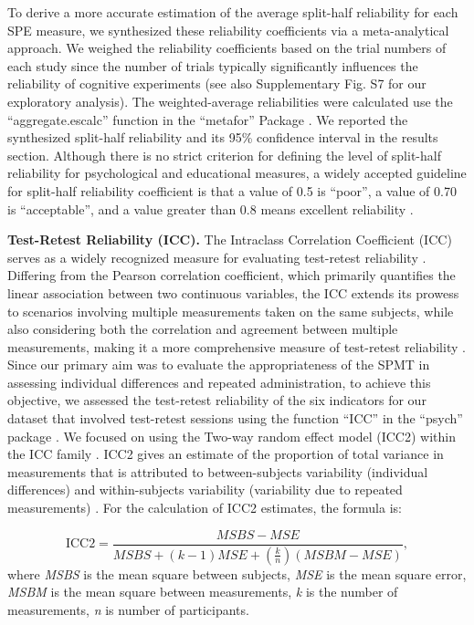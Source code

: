 \documentclass[sn-apa]{sn-jnl}%
\theoremstyle{thmstyleone}%
\theoremstyle{thmstyletwo}%
\theoremstyle{thmstylethree}%
\begin{document}
To derive a more accurate estimation of the average split-half reliability for each SPE measure, we synthesized these reliability coefficients via a meta-analytical approach. We weighed the reliability coefficients based on the trial numbers of each study since the number of trials typically significantly influences the reliability of cognitive experiments \parencite{kucina2023calibration} (see also Supplementary Fig. S7 for our exploratory analysis). The weighted-average reliabilities were calculated use the ``aggregate.escalc” function in the “metafor” Package \parencite{viechtbauer2010conducting}. We reported the synthesized split-half reliability and its 95\% confidence interval in the results section. Although there is no strict criterion for defining the level of split-half reliability for psychological and educational measures, a widely accepted guideline for split-half reliability coefficient is that a value of 0.5 is “poor”, a value of 0.70 is “acceptable”, and a value greater than 0.8 means excellent reliability \parencite{cicchetti1981developing}.  

\textbf{Test-Retest Reliability (ICC).} The Intraclass Correlation Coefficient (ICC) serves as a widely recognized measure for evaluating test-retest reliability \parencite{fisher1992statistical}. Differing from the Pearson correlation coefficient, which primarily quantifies the linear association between two continuous variables, the ICC extends its prowess to scenarios involving multiple measurements taken on the same subjects, while also considering both the correlation and agreement between multiple measurements, making it a more comprehensive measure of test-retest reliability \parencite{koo2016a}. 
Since our primary aim was to evaluate the appropriateness of the SPMT in assessing individual differences and repeated administration, to achieve this objective, we assessed the test-retest reliability of the six indicators for our dataset that involved test-retest sessions using the function ``ICC” in the “psych” package \parencite{revelle2017psych}. We focused on using the Two-way random effect model (ICC2) within the ICC family \parencite{chen2018intraclass,xu2023rex}. ICC2 gives an estimate of the proportion of total variance in measurements that is attributed to between-subjects variability (individual differences) and within-subjects variability (variability due to repeated measurements) \parencite{xu2023rex}. For the calculation of ICC2 estimates, the formula is:

\begin{equation}
	\text{ICC2}=\frac{M S B S-M S E}{M S B S+(k-1) M S E+\left(\frac{k}{n}\right)(M S B M-M S E)},
\end{equation}
where \textit{MSBS} is the mean square between subjects, \textit{MSE} is the mean square error, \textit{MSBM} is the mean square between measurements, \textit{k} is the number of measurements, \textit{n} is number of participants. 
\end{document}
